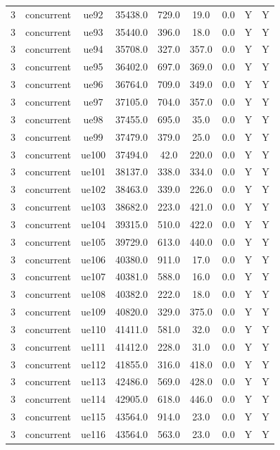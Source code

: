 \begin{table}[ht]
\begin{tabular}{|c|c|c|c|c|c|c|c|c|}
3 & concurrent & ue92 & 35438.0 & 729.0 & 19.0 & 0.0 & Y & Y \\
3 & concurrent & ue93 & 35440.0 & 396.0 & 18.0 & 0.0 & Y & Y \\
3 & concurrent & ue94 & 35708.0 & 327.0 & 357.0 & 0.0 & Y & Y \\
3 & concurrent & ue95 & 36402.0 & 697.0 & 369.0 & 0.0 & Y & Y \\
3 & concurrent & ue96 & 36764.0 & 709.0 & 349.0 & 0.0 & Y & Y \\
3 & concurrent & ue97 & 37105.0 & 704.0 & 357.0 & 0.0 & Y & Y \\
3 & concurrent & ue98 & 37455.0 & 695.0 & 35.0 & 0.0 & Y & Y \\
3 & concurrent & ue99 & 37479.0 & 379.0 & 25.0 & 0.0 & Y & Y \\
3 & concurrent & ue100 & 37494.0 & 42.0 & 220.0 & 0.0 & Y & Y \\
3 & concurrent & ue101 & 38137.0 & 338.0 & 334.0 & 0.0 & Y & Y \\
3 & concurrent & ue102 & 38463.0 & 339.0 & 226.0 & 0.0 & Y & Y \\
3 & concurrent & ue103 & 38682.0 & 223.0 & 421.0 & 0.0 & Y & Y \\
3 & concurrent & ue104 & 39315.0 & 510.0 & 422.0 & 0.0 & Y & Y \\
3 & concurrent & ue105 & 39729.0 & 613.0 & 440.0 & 0.0 & Y & Y \\
3 & concurrent & ue106 & 40380.0 & 911.0 & 17.0 & 0.0 & Y & Y \\
3 & concurrent & ue107 & 40381.0 & 588.0 & 16.0 & 0.0 & Y & Y \\
3 & concurrent & ue108 & 40382.0 & 222.0 & 18.0 & 0.0 & Y & Y \\
3 & concurrent & ue109 & 40820.0 & 329.0 & 375.0 & 0.0 & Y & Y \\
3 & concurrent & ue110 & 41411.0 & 581.0 & 32.0 & 0.0 & Y & Y \\
3 & concurrent & ue111 & 41412.0 & 228.0 & 31.0 & 0.0 & Y & Y \\
3 & concurrent & ue112 & 41855.0 & 316.0 & 418.0 & 0.0 & Y & Y \\
3 & concurrent & ue113 & 42486.0 & 569.0 & 428.0 & 0.0 & Y & Y \\
3 & concurrent & ue114 & 42905.0 & 618.0 & 446.0 & 0.0 & Y & Y \\
3 & concurrent & ue115 & 43564.0 & 914.0 & 23.0 & 0.0 & Y & Y \\
3 & concurrent & ue116 & 43564.0 & 563.0 & 23.0 & 0.0 & Y & Y \\

\end{tabular}
\end{table}
